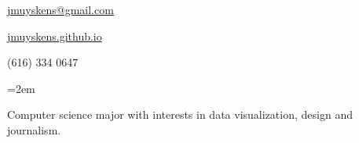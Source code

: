 \documentclass{scrartcl}
\date{} %
\newlength{\datebox}\settowidth{\datebox}{Spring 2011} %
\newcommand{\NewEntry}[3]{\noindent\hangindent=2em\hangafter=0 \parbox{\datebox}{\small \textit{#1}}\hspace{1.0em} #2 #3 %
\vspace{0.2em}} %
\newcommand{\Description}[1]{\hangindent=2em\hangafter=0\noindent\raggedright\footnotesize{#1}\par\normalsize\vspace{1em}} %
\begin{document}
\thispagestyle{empty} %


\begin{cv}{}%
\noindent \hrulefill




\hfill \href{mailto:jmuyskens@gmail.com}{jmuyskens@gmail.com} %

\hfill \href{http://jmuyskens.github.io}{jmuyskens.github.io} %

\hfill (616) 334 0647 %


%
%



\noindent{}

\vspace{1em}

\Description{Computer science major with interests in data visualization, design and journalism.}


\vspace{1em}


\end{cv}
\end{document}

